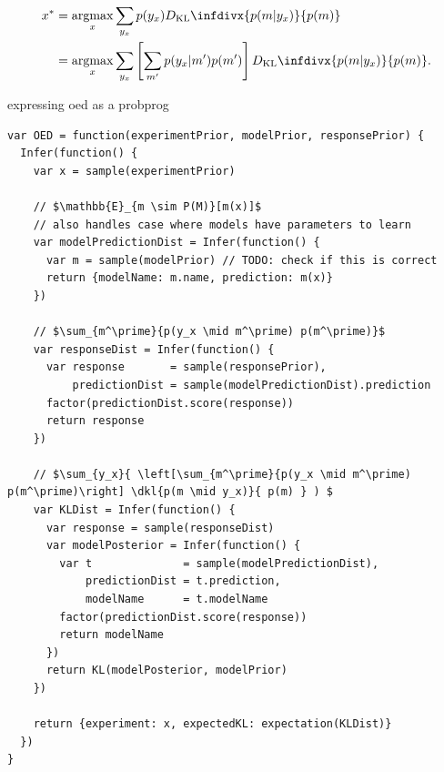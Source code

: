 \documentclass{article}
\newcommand{\dkl}{D_\textrm{KL}\infdivx}
\newcommand{\cas}[1]{ \textsf{\color{darkgray} \scriptsize #1} }
\newcommand{\argmax}{\operatornamewithlimits{argmax}}
\begin{document}
\begin{align}
x^{*} &= \argmax_{x} \sum\limits_{y_x} p(y_x) \dkl{ p(m|y_x) }{ p(m) } \notag \\
    &= \argmax_{x} \sum\limits_{y_x} \left[\sum\limits_{m'} p(y_x|m')p(m')\right] \dkl{p(m|y_x)}{p(m)}. \label{eq:oed}
\end{align}

\cas{expressing oed as a probprog}

\begin{lstlisting}[mathescape=true]
var OED = function(experimentPrior, modelPrior, responsePrior) {
  Infer(function() {
    var x = sample(experimentPrior)

    // $\mathbb{E}_{m \sim P(M)}[m(x)]$
    // also handles case where models have parameters to learn
    var modelPredictionDist = Infer(function() {
      var m = sample(modelPrior) // TODO: check if this is correct
      return {modelName: m.name, prediction: m(x)}
    })

    // $\sum_{m^\prime}{p(y_x \mid m^\prime) p(m^\prime)}$
    var responseDist = Infer(function() {
      var response       = sample(responsePrior),
          predictionDist = sample(modelPredictionDist).prediction
      factor(predictionDist.score(response))
      return response
    })

    // $\sum_{y_x}{ \left[\sum_{m^\prime}{p(y_x \mid m^\prime) p(m^\prime)\right] \dkl{p(m \mid y_x)}{ p(m) } ) $
    var KLDist = Infer(function() {
      var response = sample(responseDist)
      var modelPosterior = Infer(function() {
        var t              = sample(modelPredictionDist),
            predictionDist = t.prediction,
            modelName      = t.modelName
        factor(predictionDist.score(response))
        return modelName
      })
      return KL(modelPosterior, modelPrior)
    })

    return {experiment: x, expectedKL: expectation(KLDist)}
  })
}
\end{lstlisting}
\end{document}

